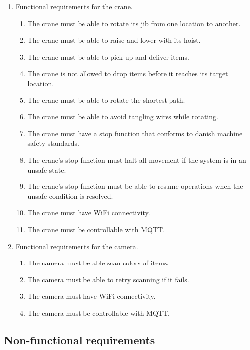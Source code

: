 \begin{enumerate}
    \item Functional requirements for the crane.
    \begin{enumerate}
        \item The crane must be able to rotate its jib from one location to another.
        \item The crane must be able to raise and lower with its hoist.
        \item The crane must be able to pick up and deliver items.
        \item The crane is not allowed to drop items before it reaches its target location.
        \item The crane must be able to rotate the shortest path.
        \item The crane must be able to avoid tangling wires while rotating.
        \item The crane must have a stop function that conforms to danish machine safety standards.
        \item The crane's stop function must halt all movement if the system is in an unsafe state.
        \item The crane's stop function must be able to resume operations when the unsafe condition is resolved.
        \item The crane must have WiFi connectivity.
        \item The crane must be controllable with MQTT.
    \end{enumerate}
    \vspace{1em}


    \item Functional requirements for the camera.
    \begin{enumerate}
        \item The camera must be able scan colors of items.
        \item The camera must be able to retry scanning if it fails.
        \item The camera must have WiFi connectivity.
        \item The camera must be controllable with MQTT.
    \end{enumerate}
\end{enumerate}

\subsection{Non-functional requirements}

